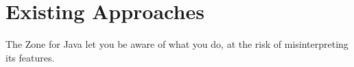 
\chapter{Existing Approaches}
\label{ch:approaches}

The Zone for Java let you be aware of what you do, at the risk of misinterpreting its features.

\section{\zonejs}



\section{\zonedrt}


